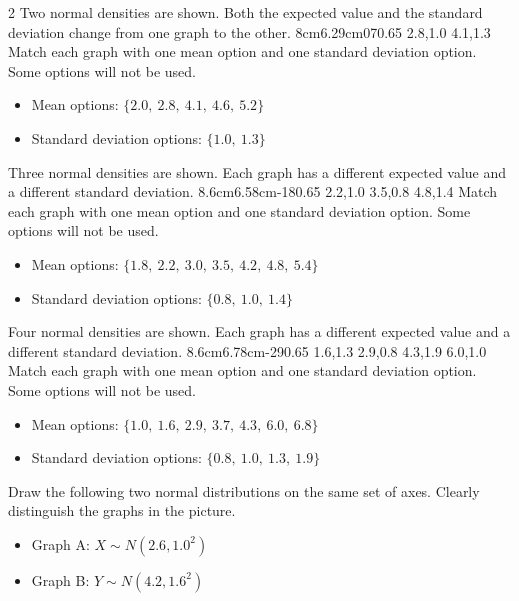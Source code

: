 \begin{multicols}{2}
		\vspace{-0.35cm}
		Two normal densities are shown. Both the expected value and the standard deviation change from one graph to the other.
		\vspace{-0.7cm}
		\NormalTwoGraph
		{8cm}{6.29cm}{0}{7}{0.65}
		{2.8,1.0}
		{4.1,1.3}
		Match each graph with one mean option and one standard deviation option. Some options will not be used.
		\begin{itemize}
			\item Mean options: $\{2.0,\ 2.8,\ 4.1,\ 4.6,\ 5.2\}$
			\item Standard deviation options: $\{1.0,\ 1.3\}$
		\end{itemize}
		
		\vspace{-0.35cm}
		Three normal densities are shown. Each graph has a different expected value and a different standard deviation.
		\NormalThreeGraph
		{8.6cm}{6.58cm}{-1}{8}{0.65}
		{2.2,1.0}
		{3.5,0.8}
		{4.8,1.4}
		Match each graph with one mean option and one standard deviation option. Some options will not be used.
		\begin{itemize}
			\item Mean options: $\{1.8,\ 2.2,\ 3.0,\ 3.5,\ 4.2,\ 4.8,\ 5.4\}$
			\item Standard deviation options: $\{0.8,\ 1.0,\ 1.4\}$
		\end{itemize}
		
		\vspace{-0.35cm}
		Four normal densities are shown. Each graph has a different expected value and a different standard deviation.
		\NormalFourGraph
		{8.6cm}{6.78cm}{-2}{9}{0.65}
		{1.6,1.3}
		{2.9,0.8}
		{4.3,1.9}
		{6.0,1.0}
		Match each graph with one mean option and one standard deviation option. Some options will not be used.
		\begin{itemize}
			\item Mean options: $\{1.0,\ 1.6,\ 2.9,\ 3.7,\ 4.3,\ 6.0,\ 6.8\}$
			\item Standard deviation options: $\{0.8,\ 1.0,\ 1.3,\ 1.9\}$
		\end{itemize}
		
		\vspace{-0.35cm}
		Draw the following two normal distributions on the same set of axes. Clearly distinguish the graphs in the picture.
		\begin{itemize}
			\item Graph A: $X\sim N(2.6,1.0^2)$
			\item Graph B: $Y\sim N(4.2,1.6^2)$
		\end{itemize}
		

\end{multicols}
